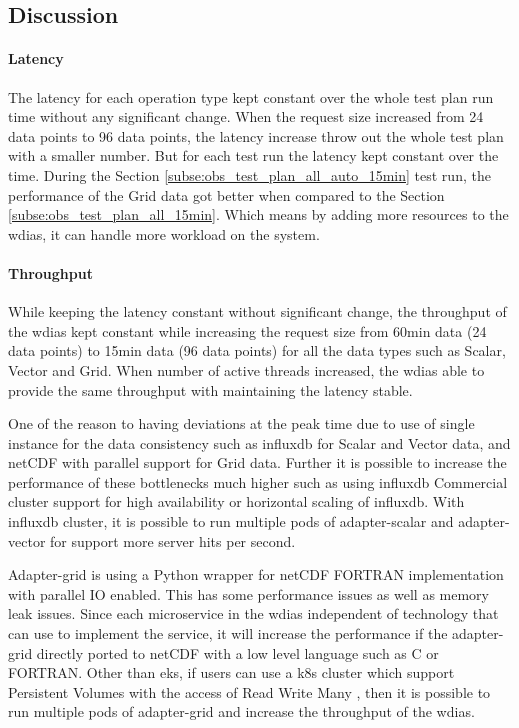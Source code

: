 \documentclass[conference]{IEEEtran}
\begin{document}
\subsection{Discussion}
\paragraph{Latency}
The latency for each operation type kept constant over the whole test plan run time without any significant change. When the request size increased from 24 data points to 96 data points, the latency increase throw out the whole test plan with a smaller number. But for each test run the latency kept constant over the time.
During the Section \ref{subse:obs_test_plan_all_auto_15min} test run, the performance of the Grid data got better when compared to the Section \ref{subse:obs_test_plan_all_15min}. Which means by adding more resources to the \acrshort{wdias}, it can handle more workload on the system.

\paragraph{Throughput}
While keeping the latency constant without significant change, the throughput of the \acrshort{wdias} kept constant while increasing the request size from 60min data (24 data points) to 15min data (96 data points) for all the data types such as Scalar, Vector and Grid.
When number of active threads increased, the \acrshort{wdias} able to provide the same throughput with maintaining the latency stable.

One of the reason to having deviations at the peak time due to use of single instance for the data consistency such as \acrshort{influxdb} for Scalar and Vector data, and netCDF with parallel support for Grid data. Further it is possible to increase the performance of these bottlenecks much higher such as using \acrshort{influxdb} Commercial cluster support for high availability or horizontal scaling of \acrshort{influxdb}. With \acrshort{influxdb} cluster, it is possible to run multiple pods of adapter-scalar and adapter-vector for support more server hits per second.

Adapter-grid is using a Python wrapper for netCDF FORTRAN implementation with parallel IO enabled. This has some performance issues as well as memory leak issues. Since each microservice in the \acrshort{wdias} independent of technology that can use to implement the service, it will increase the performance if the adapter-grid directly ported to netCDF with a low level language such as C or FORTRAN.
Other than \acrshort{eks}, if users can use a \acrshort{k8s} cluster which support Persistent Volumes with the access of Read Write  Many \cite{LinuxFoundationPersistentKubernetes} , then it is possible to run multiple pods of adapter-grid and increase the throughput of the \acrshort{wdias}.
\end{document}
